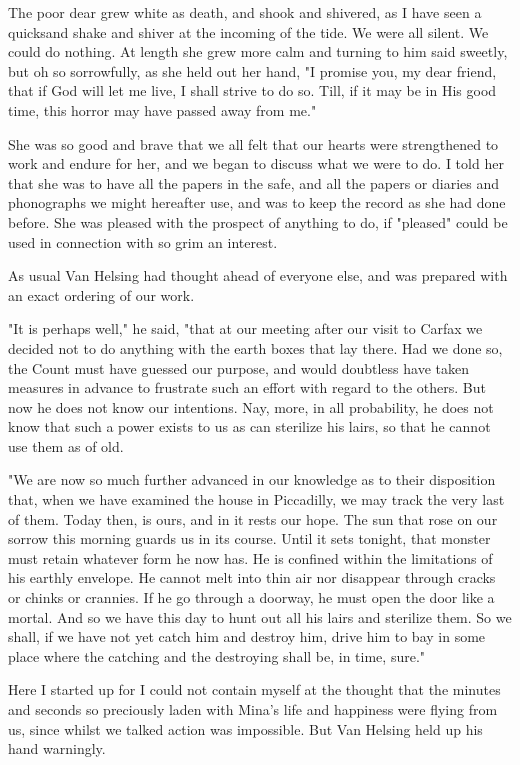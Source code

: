 The poor dear grew white as death, and shook and shivered, as I have seen a quicksand shake and shiver at the incoming of the tide. We were all silent. We could do nothing. At length she grew more calm and turning to him said sweetly, but oh so sorrowfully, as she held out her hand, "I promise you, my dear friend, that if God will let me live, I shall strive to do so. Till, if it may be in His good time, this horror may have passed away from me." 

She was so good and brave that we all felt that our hearts were strengthened to work and endure for her, and we began to discuss what we were to do. I told her that she was to have all the papers in the safe, and all the papers or diaries and phonographs we might hereafter use, and was to keep the record as she had done before. She was pleased with the prospect of anything to do, if "pleased" could be used in connection with so grim an interest. 

As usual Van Helsing had thought ahead of everyone else, and was prepared with an exact ordering of our work. 

"It is perhaps well," he said, "that at our meeting after our visit to Carfax we decided not to do anything with the earth boxes that lay there. Had we done so, the Count must have guessed our purpose, and would doubtless have taken measures in advance to frustrate such an effort with regard to the others. But now he does not know our intentions. Nay, more, in all probability, he does not know that such a power exists to us as can sterilize his lairs, so that he cannot use them as of old. 

"We are now so much further advanced in our knowledge as to their disposition that, when we have examined the house in Piccadilly, we may track the very last of them. Today then, is ours, and in it rests our hope. The sun that rose on our sorrow this morning guards us in its course. Until it sets tonight, that monster must retain whatever form he now has. He is confined within the limitations of his earthly envelope. He cannot melt into thin air nor disappear through cracks or chinks or crannies. If he go through a doorway, he must open the door like a mortal. And so we have this day to hunt out all his lairs and sterilize them. So we shall, if we have not yet catch him and destroy him, drive him to bay in some place where the catching and the destroying shall be, in time, sure." 

Here I started up for I could not contain myself at the thought that the minutes and seconds so preciously laden with Mina's life and happiness were flying from us, since whilst we talked action was impossible. But Van Helsing held up his hand warningly. 

